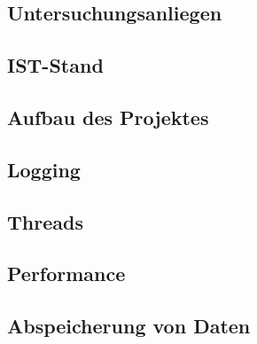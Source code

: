 \begin{spacing}{1}
    \section{Untersuchungsanliegen}\label{section:untersuchungsanliegenFlexlogger}
    \end{spacing}


\begin{spacing}{1}
    \section{IST-Stand}\label{section:ist-standFlexlogger}
    \end{spacing}


\begin{spacing}{1}
    \section{Aufbau des Projektes}\label{section:aufbaudesProjektesFlexlogger}
    \end{spacing}


\begin{spacing}{1}
    \section{Logging}\label{section:logging}
    \end{spacing}


\begin{spacing}{1}
    \section{Threads}\label{section:threads}
    \end{spacing}


\begin{spacing}{1}
    \section{Performance}\label{section:performance}
    \end{spacing}


\begin{spacing}{1}
    \section{Abspeicherung von Daten}\label{section:savedata}
    \end{spacing}

